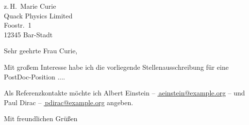 \documentclass[
  parskip=half,
  fromemail,
  fromphone,
  backaddress=false,
  enlargefirstpage,
  firstfoot=false,
  foldmarks=false,
  DIV=15,
  fromalign=locationright,
]{scrlttr2}
\newcommand\mail[1]{\href{mailto:#1}{\faEnvelope[regular]\,#1}}
\begin{document}
\begin{letter}{%
  z.\,H.\ Marie Curie\\
  Quack Physics Limited\\
  Foostr.~1\\
  12345 Bar-Stadt
}%

\opening{Sehr geehrte Frau Curie,}

Mit großem Interesse habe ich die vorliegende Stellenausschreibung für eine
PostDoc-Position ....

\blindtext

\blindtext

Als Referenzkontakte möchte ich
Albert Einstein – \mail{aeinstein@example.org} –
und Paul Dirac – \mail{pdirac@example.org} angeben.

\closing{Mit freundlichen Grüßen}

\end{letter}


\end{document}
